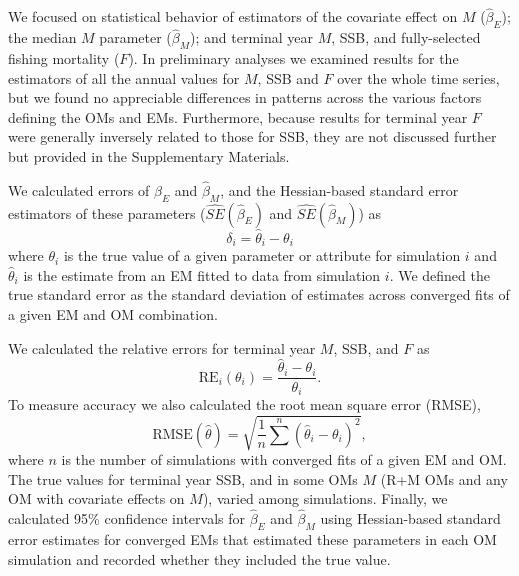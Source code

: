 \documentclass[
  12pt,
]{article}
\begin{document}
We focused on statistical behavior of estimators of the covariate effect on \(M\) (\(\widehat \beta_E\)); the median \(M\) parameter (\(\widehat \beta_M\)); and terminal year \(M\), SSB, and fully-selected fishing mortality (\(F\)). In preliminary analyses we examined results for the estimators of all the annual values for \(M\), SSB and \(F\) over the whole time series, but we found no appreciable differences in patterns across the various factors defining the OMs and EMs. Furthermore, because results for terminal year \(F\) were generally inversely related to those for SSB, they are not discussed further but provided in the Supplementary Materials.

We calculated errors of \(\widehat \beta_E\) and \(\widehat \beta_M\), and the Hessian-based standard error estimators of these parameters (\(\widehat{SE}\left(\widehat \beta_E\right)\) and \(\widehat{SE}\left(\widehat \beta_M\right)\)) as
\[
\delta_i = \widehat \theta_i - \theta_i
\]
where \(\theta_i\) is the true value of a given parameter or attribute for simulation \(i\) and \(\widehat \theta_i\) is the estimate from an EM fitted to data from simulation \(i\). We defined the true standard error as the standard deviation of estimates across converged fits of a given EM and OM combination.

We calculated the relative errors for terminal year \(M\), SSB, and \(F\) as
\begin{equation}\label{relerror}
\text{RE}_i\left(\theta_i\right) = \frac{\widehat \theta_i - \theta_i}{\theta_i}.
\end{equation}
To measure accuracy we also calculated the root mean square error (RMSE),
\[
\text{RMSE}\left(\widehat \theta\right) = \sqrt{\frac{1}{n}\sum^n\left(\widehat \theta_i - \theta_i\right)^2},
\]
where \(n\) is the number of simulations with converged fits of a given EM and OM. The true values for terminal year SSB, and in some OMs \(M\) (R+M OMs and any OM with covariate effects on \(M\)), varied among simulations. Finally, we calculated 95\% confidence intervals for \(\widehat \beta_E\) and \(\widehat \beta_M\) using Hessian-based standard error estimates for converged EMs that estimated these parameters in each OM simulation and recorded whether they included the true value.
\end{document}
